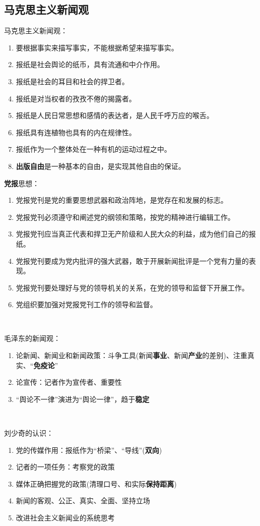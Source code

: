 \documentclass[a4paper,UTF8]{ctexart}
\begin{document}
\subsection{马克思主义新闻观}
马克思主义新闻观：
\begin{enumerate}
	\item 要根据事实来描写事实，不能根据希望来描写事实。
	\item 报纸是社会舆论的纸币，具有流通和中介作用。
	\item 报纸是社会的耳目和社会的捍卫者。
	\item 报纸是对当权者的孜孜不倦的揭露者。
	\item 报纸是人民日常思想和感情的表达者，是人民千呼万应的喉舌。
	\item 报纸具有连植物也具有的内在规律性。
	\item 报纸作为一个整体处在一种有机的运动过程之中。
	\item \textbf{出版自由}是一种基本的自由，是实现其他自由的保证。
\end{enumerate}

\textbf{党报}思想：
\begin{enumerate}
	\item 党报党刊是党的重要思想武器和政治阵地，是党存在和发展的标志。
	\item 党报党刊必须遵守和阐述党的纲领和策略，按党的精神进行编辑工作。
	\item 党报党刊应当真正代表和捍卫无产阶级和人民大众的利益，成为他们自己的报纸。
	\item 党报党刊要成为党内批评的强大武器，敢于开展新闻批评是一个党有力量的表现。
	\item 党报党刊要处理好与党的领导机关的关系，在党的领导和监督下开展工作。
	\item 党组织要加强对党报党刊工作的领导和监督。
\end{enumerate}

~

毛泽东的新闻观：
\begin{enumerate}
	\item 论新闻、新闻业和新闻政策：斗争工具(新闻\textbf{事业}、新闻\textbf{产业}的差别)、注重真实、“\textbf{免疫论}”
	\item 论宣传：记者作为宣传者、重要性
	\item “舆论不一律”演进为“舆论一律”，趋于\textbf{稳定}
\end{enumerate}

~

刘少奇的认识：
\begin{enumerate}
	\item 党的传媒作用：报纸作为“桥梁”、“导线”(\textbf{双向})
	\item 记者的一项任务：考察党的政策
	\item 媒体正确把握党的政策(清理口号、和实际\textbf{保持距离})
	\item 新闻的客观、公正、真实、全面、坚持立场
	\item 改进社会主义新闻业的系统思考
\end{enumerate}
\end{document}
